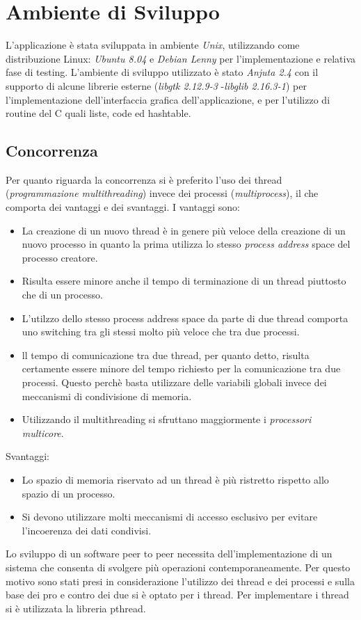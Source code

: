 \chapter{Ambiente di Sviluppo}
L'applicazione è stata sviluppata in ambiente \textit{Unix}, utilizzando come distribuzione Linux: \textit{Ubuntu 8.04} e \textit{Debian Lenny} per l'implementazione e relativa fase di testing.
L'ambiente di sviluppo utilizzato è stato \textit{Anjuta 2.4} con il supporto di alcune librerie esterne (\textit{libgtk 2.12.9-3} -\textit{libglib 2.16.3-1}) per l'implementazione dell'interfaccia grafica dell'applicazione, e per l'utilizzo di routine del C quali liste, code ed hashtable.
\section{Concorrenza}
Per quanto riguarda la concorrenza si è preferito l'uso dei thread (\textit{programmazione multithreading}) invece dei processi (\textit{multiprocess}), il che comporta dei vantaggi e dei svantaggi. I vantaggi sono: 
\begin{itemize}
\item La creazione di un nuovo thread è in genere più veloce della creazione di un nuovo processo in quanto la prima utilizza lo stesso \textit{process address} space del processo creatore. 
\item Risulta essere minore anche il tempo di terminazione di un thread piuttosto che di un processo. 
\item L'utilzzo dello stesso process address space da parte di due thread comporta uno switching tra gli stessi molto più veloce che tra due processi. 
\item ll tempo di comunicazione tra due thread, per quanto detto, risulta certamente essere minore del tempo richiesto per la comunicazione tra due processi. Questo perchè basta utilizzare delle variabili globali invece dei meccanismi di condivisione di memoria.
\item Utilizzando il multithreading si sfruttano maggiormente i \textit{processori multicore}.
\end{itemize}
Svantaggi:
\begin{itemize}
\item Lo spazio di memoria riservato ad un thread è più ristretto rispetto allo spazio di un processo.
\item Si devono utilizzare molti meccanismi di accesso esclusivo per evitare l'incoerenza dei dati condivisi.
\end{itemize}
Lo sviluppo di un software peer to peer necessita dell’implementazione di un sistema che consenta di svolgere più operazioni contemporaneamente. Per questo motivo sono stati presi in considerazione l’utilizzo dei thread e dei processi e sulla base dei pro e contro dei due si è optato per i thread. Per implementare i thread si è utilizzata la libreria pthread.
